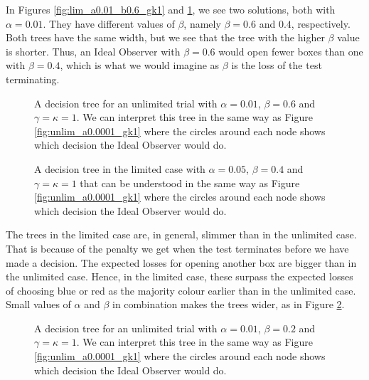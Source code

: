 In Figures \ref{fig:lim_a0.01_b0.6_gk1} and \ref{fig:lim_a0.01_b0.4_gk1}, we see two solutions, both with $\alpha=0.01$. They have different values of $\beta$, namely $\beta=0.6$ and $0.4$, respectively. Both trees have the same width, but we see that the tree with the higher $\beta$ value is shorter. Thus, an Ideal Observer with $\beta=0.6$ would open fewer boxes than one with $\beta=0.4$, which is what we would imagine as $\beta$ is the loss of the test terminating. 
\begin{figure}
    \centering
    \begin{minipage}[t]{0.45\textwidth}
        \centering
        \scalebox{0.6}{}
        \caption[IO solution, limited. $\alpha=0.01$, $\beta=0.6$ and $\gamma=\kappa=1$]{A decision tree for an unlimited trial with $\alpha = 0.01$, $\beta=0.6$ and $\gamma=\kappa=1$.
        We can interpret this tree in the same way as Figure \ref{fig:unlim_a0.0001_gk1} where the circles around each node shows which decision the Ideal Observer would do.}
        \label{fig:lim_a0.01_b0.6_gk1}
    \end{minipage}\hfill
    \begin{minipage}[t]{0.45\textwidth}
        \centering
        \scalebox{0.6}{}
        \caption[IO solution, limited. $\alpha=0.01$, $\beta=0.4$ and $\gamma=\kappa=1$]{A decision tree in the limited case with $\alpha = 0.05$, $\beta=0.4$ and $\gamma=\kappa=1$ that can be understood in the same way as Figure \ref{fig:unlim_a0.0001_gk1} where the circles around each node shows which decision the Ideal Observer would do.}
        \label{fig:lim_a0.01_b0.4_gk1}
    \end{minipage}
\end{figure}


The trees in the limited case are, in general, slimmer than in the unlimited case. That is because of the penalty we get when the test terminates before we have made a decision. The expected losses for opening another box are bigger than in the unlimited case. Hence, in the limited case, these surpass the expected losses of choosing blue or red as the majority colour earlier than in the unlimited case. Small values of $\alpha$ and $\beta$ in combination makes the trees wider, as in Figure \ref{fig:lim_a0.0001_b0.2_gk1}.
\begin{figure}
    \centering
    \scalebox{0.8}{}
    \caption[IO solution, limited. $\alpha=0.0001, \beta=0.2$. $\gamma=\kappa=1$.]{A decision tree for an unlimited trial with $\alpha = 0.01$, $\beta=0.2$ and $\gamma=\kappa=1$.
    We can interpret this tree in the same way as Figure \ref{fig:unlim_a0.0001_gk1} where the circles around each node shows which decision the Ideal Observer would do.}
    \label{fig:lim_a0.0001_b0.2_gk1}
\end{figure}


